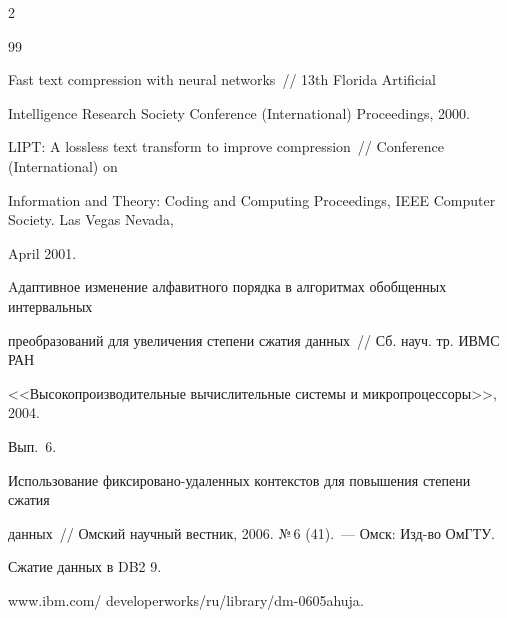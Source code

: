 \begin{multicols}{2}
{{\begin{thebibliography}{99}




Fast text compression with neural networks~// 13th Florida Artificial 


Intelligence Research Society Conference (International) Proceedings, 2000.









LIPT: A lossless text transform to improve compression~// Conference (International) on 


Information and Theory: Coding and Computing Proceedings, IEEE Computer Society. Las Vegas Nevada, 


April 2001.












Aдаптивное изменение алфавитного порядка в алгоритмах обобщенных интервальных 


преобразований для увеличения степени сжатия данных~// Сб. науч. тр. ИВМС РАН 


<<Высокопроизводительные вычислительные системы и микропроцессоры>>, 2004. 


Вып.~6.









Использование фиксировано-удаленных контекстов для повышения степени сжатия 


данных~// Омский научный вестник, 2006. №\,6 (41).~--- Омск: Изд-во ОмГТУ. 









Сжатие данных в DB2 9.  


{\sf www.ibm.com/ developerworks/ru/library/dm-0605ahuja}.













\end{thebibliography}}}
\end{multicols}
